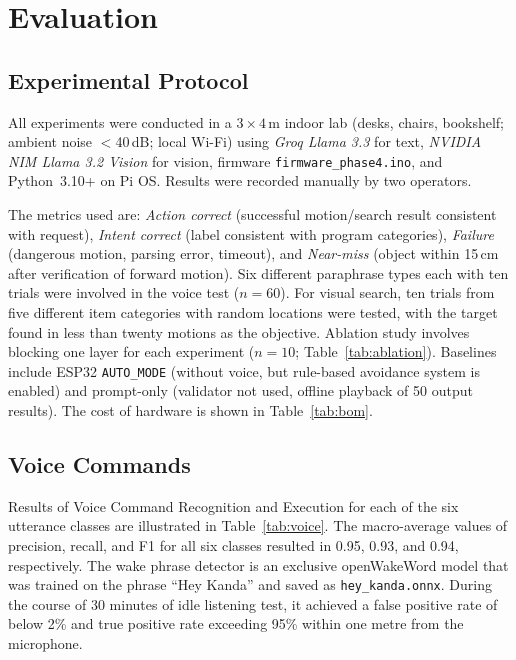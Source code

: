 \documentclass[conference]{IEEEtran}
\newcommand{\groq}{\textit{Groq Llama 3.3}}
\newcommand{\nvidia}{\textit{NVIDIA NIM Llama 3.2 Vision}}
\begin{document}
\section{Evaluation}
\label{sec:results}

\subsection{Experimental Protocol}
\label{sec:protocol}

All experiments were conducted in a $3 \times 4$\,m indoor lab (desks, chairs, bookshelf; ambient noise ${<}$40\,dB; local Wi-Fi) using \groq{} for text, \nvidia{} for vision, firmware \texttt{firmware\_phase4.ino}, and Python~3.10+ on Pi OS. Results were recorded manually by two operators.

The metrics used are: \emph{Action correct} (successful motion/search result consistent with request), \emph{Intent correct} (label consistent with program categories), \emph{Failure} (dangerous motion, parsing error, timeout), and \emph{Near-miss} (object within 15\,cm after verification of forward motion). Six different paraphrase types each with ten trials were involved in the voice test ($n{=}60$). For visual search, ten trials from five different item categories with random locations were tested, with the target found in less than twenty motions as the objective. Ablation study involves blocking one layer for each experiment ($n{=}10$; Table~\ref{tab:ablation}). Baselines include ESP32 \texttt{AUTO\_MODE} (without voice, but rule-based avoidance system is enabled) and prompt-only (validator not used, offline playback of 50 output results). The cost of hardware is shown in Table~\ref{tab:bom}.

\subsection{Voice Commands}

Results of Voice Command Recognition and Execution for each of the six utterance classes are illustrated in Table~\ref{tab:voice}. The macro-average values of precision, recall, and F1 for all six classes resulted in 0.95, 0.93, and 0.94, respectively. The wake phrase detector is an exclusive openWakeWord model that was trained on the phrase ``Hey Kanda'' and saved as \texttt{hey\_kanda.onnx}. During the course of 30 minutes of idle listening test, it achieved a false positive rate of below 2\% and true positive rate exceeding 95\% within one metre from the microphone.
\end{document}
